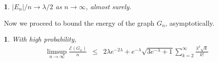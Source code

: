 \documentclass[a4paper]{article}
\newcommand{\abs}[1]{\left\lvert#1\right\rvert}
\newcommand{\E}[1]{\mathbb{E}\left(#1\right)}
\DeclareMathOperator{\var}{Var}
\newcommand{\Var}[1]{\var\left(#1\right)}
\newcommand{\energy}[1]{\mathcal{E}\left(#1\right)}
\theoremstyle{plain}
\newtheorem{proposition}{\protect\propname}
\newtheorem{theorem}{\protect\thmaname}
\renewcommand{\propname}{Proposition}
\renewcommand{\thmaname}{Theorem}%
\renewcommand{\propname}{Proposici\'on}
\renewcommand{\thmaname}{Teorema}%
\begin{document}

\begin{proposition}\label{ER-edges}
\(\abs{E_n}/n \to \lambda/2\) as \(n \to \infty\), almost surely.
\end{proposition}


Now we proceed to bound the energy of the graph $G_n$, asymptotically.
\begin{theorem}\label{ER-bound1}
    With high probability,
  \begin{eqnarray}
    \limsup_{n \to \infty} \frac{\energy{G_n}}{n} &\leq& 2\lambda e^{-2\lambda} + e^{-\lambda}\sqrt{3e^{-\lambda} + 1}\sum_{k = 2}^{\infty} \frac{\lambda^k\sqrt{k}}{k!} 
\end{eqnarray}

\end{theorem}
\end{document}
